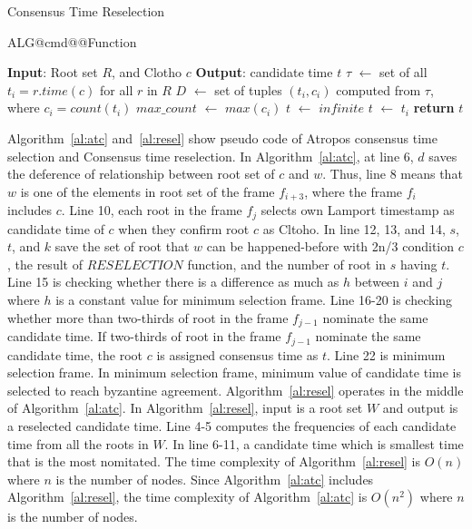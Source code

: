 \documentclass{article}
\makeatletter
\renewcommand{\Function}[2]{%
	\csname ALG@cmd@\ALG@L @Function\endcsname{#1}{#2}%
	\def\jayden@currentfunction{#1}%
}
\newcommand{\funclabel}[1]{%
	\@bsphack
	\protected@write\@auxout{}{%
		\string\newlabel{#1}{{\jayden@currentfunction}{\thepage}}%
	}%
	\@esphack
}
\makeatother
\begin{document}
\begin{algorithm} [H]
\caption{Consensus Time Reselection}\label{al:resel}
\begin{algorithmic}[1]
	\Function{Reselection}{} \funclabel{alg:a}
	\State \textbf{Input}: Root set $R$, and Clotho $c$
	\State \textbf{Output}: candidate time $t$
	\State $\tau$ $\leftarrow$ set of all $t_i = r.time(c)$ for all $r$ in $R$
	\State $D$  $\leftarrow$ set of tuples $(t_i, c_i)$ computed from $\tau$, where $c_i= count(t_i)$
	\State $max\_count$ $\leftarrow$ $max(c_i)$
	\State $t$ $\leftarrow$ $infinite$
	\State $t$ $\leftarrow$ $t_i$
	\EndIf
	\EndFor
	\State \textbf{return} $t$
	\EndFunction
\end{algorithmic}
\end{algorithm}

Algorithm~\ref{al:atc} and~\ref{al:resel} show pseudo code of Atropos consensus time selection and Consensus time reselection. In Algorithm~\ref{al:atc}, at line 6, $d$ saves the deference of relationship between root set of $c$ and $w$. Thus, line 8 means that $w$ is one of the elements in root set of the frame $f_{i+3}$, where the frame $f_i$ includes $c$. Line 10, each root in the frame $f_j$ selects own Lamport timestamp as candidate time of $c$ when they confirm root $c$ as Cltoho. In line 12, 13, and 14, $s$, $t$, and $k$ save the set of root that $w$ can be happened-before with 2n/3 condition $c$, the result of $RESELECTION$ function, and the number of root in $s$ having $t$. Line 15 is checking whether there is a difference as much as $h$ between $i$ and $j$ where $h$ is a constant value for minimum selection frame. Line 16-20 is checking whether more than two-thirds of root in the frame $f_{j-1}$ nominate the same candidate time. If two-thirds of root in the frame $f_{j-1}$ nominate the same candidate time, the root $c$ is assigned consensus time as $t$. Line 22 is minimum selection frame. In minimum selection frame, minimum value of candidate time is selected to reach byzantine agreement. Algorithm~\ref{al:resel} operates in the middle of Algorithm~\ref{al:atc}. In Algorithm~\ref{al:resel}, input is a root set $W$ and output is a reselected candidate time. Line 4-5 computes the frequencies of each candidate time from all the roots in $W$. In line 6-11, a candidate time which is smallest time that is the most nomitated. The time complexity of Algorithm~\ref{al:resel} is $O(n)$ where $n$ is the number of nodes. Since Algorithm~\ref{al:atc} includes Algorithm~\ref{al:resel}, the time complexity of Algorithm~\ref{al:atc} is $O(n^2)$ where $n$ is the number of nodes.
\end{document}
